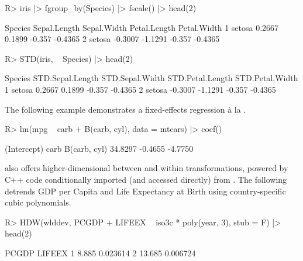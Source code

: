 \documentclass[article]{jss}
\begin{document}
\begin{Schunk}
\begin{Sinput}
R> iris |> fgroup_by(Species) |> fscale() |> head(2)
\end{Sinput}
\begin{Soutput}
  Species Sepal.Length Sepal.Width Petal.Length Petal.Width
1  setosa       0.2667      0.1899       -0.357     -0.4365
2  setosa      -0.3007     -1.1291       -0.357     -0.4365
\end{Soutput}
\begin{Sinput}
R> STD(iris, ~ Species) |> head(2)
\end{Sinput}
\begin{Soutput}
  Species STD.Sepal.Length STD.Sepal.Width STD.Petal.Length STD.Petal.Width
1  setosa           0.2667          0.1899           -0.357         -0.4365
2  setosa          -0.3007         -1.1291           -0.357         -0.4365
\end{Soutput}
\end{Schunk}
The following example demonstrates a fixed-effects regression \`a la \citet{mundlak1978pooling}.
\begin{Schunk}
\begin{Sinput}
R> lm(mpg ~ carb + B(carb, cyl), data = mtcars) |> coef()
\end{Sinput}
\begin{Soutput}
 (Intercept)         carb B(carb, cyl) 
     34.8297      -0.4655      -4.7750 
\end{Soutput}
\end{Schunk}
 also offers higher-dimensional between and within transformations, powered by C++ code conditionally imported (and accessed directly) from . The following detrends GDP per Capita and Life Expectancy at Birth using country-specific cubic polynomials.
\begin{Schunk}
\begin{Sinput}
R> HDW(wlddev, PCGDP + LIFEEX ~ iso3c * poly(year, 3), stub = F) |> head(2)
\end{Sinput}
\begin{Soutput}
   PCGDP   LIFEEX
1  8.885 0.023614
2 13.685 0.006724
\end{Soutput}
\end{Schunk}
%
\end{document}
